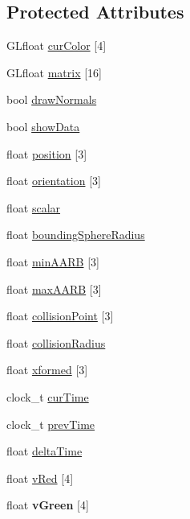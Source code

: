 \subsection*{Protected Attributes}
\begin{DoxyCompactItemize}
\item 
G\-Lfloat \hyperlink{class_drawable_object_a53a37ba10a56302e75fdd5a77985ae43}{cur\-Color} \mbox{[}4\mbox{]}
\item 
G\-Lfloat \hyperlink{class_drawable_object_a2703563492849f1157e2f069ed80fc80}{matrix} \mbox{[}16\mbox{]}
\item 
bool \hyperlink{class_drawable_object_a7edaffb26b2265b38cdfcc97883ba98b}{draw\-Normals}
\item 
bool \hyperlink{class_drawable_object_aaec51d93bc4b79cf9fff8fdd30033e09}{show\-Data}
\item 
float \hyperlink{class_drawable_object_a1be8afe81c6c559f63c6ed01cdbcac45}{position} \mbox{[}3\mbox{]}
\item 
float \hyperlink{class_drawable_object_a4ade91da08f574dfb3776ca18d69f4f3}{orientation} \mbox{[}3\mbox{]}
\item 
float \hyperlink{class_drawable_object_a099a45653005dc07dff68e40465e7838}{scalar}
\item 
float \hyperlink{class_drawable_object_ab2a5aac6a78a7680449257ebe996f8e4}{bounding\-Sphere\-Radius}
\item 
float \hyperlink{class_drawable_object_a9f5690cffbebb0697e02f5676b43e881}{min\-A\-A\-R\-B} \mbox{[}3\mbox{]}
\item 
float \hyperlink{class_drawable_object_a3410849bc648108304595e21c11a78f8}{max\-A\-A\-R\-B} \mbox{[}3\mbox{]}
\item 
float \hyperlink{class_drawable_object_a0d9d6dab30ccb7696a17f262477e678f}{collision\-Point} \mbox{[}3\mbox{]}
\item 
float \hyperlink{class_drawable_object_a69b3952eaeae380114be118198908fdf}{collision\-Radius}
\item 
float \hyperlink{class_drawable_object_a8c8fb8681530026cd28f4bff61d37bdd}{xformed} \mbox{[}3\mbox{]}
\item 
clock\-\_\-t \hyperlink{class_drawable_object_abbd6a912f2bdc24bcb2ae342cb016c08}{cur\-Time}
\item 
clock\-\_\-t \hyperlink{class_drawable_object_af460310076bad5748078c84c4ddd7f60}{prev\-Time}
\item 
float \hyperlink{class_drawable_object_a590806d20dcd8f7e1422075b2f147cb6}{delta\-Time}
\item 
float \hyperlink{class_drawable_object_a5b57b3602270163662876bb86277602f}{v\-Red} \mbox{[}4\mbox{]}
\item 
\hypertarget{class_drawable_object_a8da6671a66e9f45d611685ee1eb01fdb}{float {\bfseries v\-Green} \mbox{[}4\mbox{]}}\label{class_drawable_object_a8da6671a66e9f45d611685ee1eb01fdb}


\end{DoxyCompactItemize}
